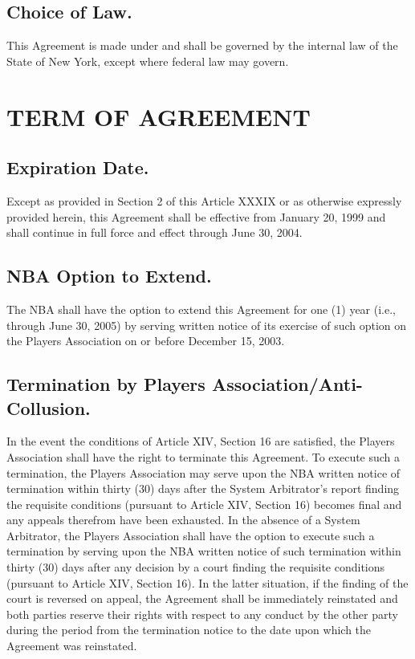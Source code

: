 \documentclass[
]{book}
\begin{document}
\hypertarget{choice-of-law.}{%
\section{Choice of Law.}\label{choice-of-law.}}

This Agreement is made under and shall be governed by the internal law of the State of New York, except where federal law may govern.

\hypertarget{term-of-agreement}{%
\chapter{TERM OF AGREEMENT}\label{term-of-agreement}}

\hypertarget{expiration-date.}{%
\section{Expiration Date.}\label{expiration-date.}}

Except as provided in Section 2 of this Article XXXIX or as otherwise expressly provided herein, this Agreement shall be effective from January 20, 1999 and shall continue in full force and effect through June 30, 2004.

\hypertarget{nba-option-to-extend.}{%
\section{NBA Option to Extend.}\label{nba-option-to-extend.}}

The NBA shall have the option to extend this Agreement for one (1) year (i.e., through June 30, 2005) by serving written notice of its exercise of such option on the Players Association on or before December 15, 2003.

\hypertarget{termination-by-players-associationanti-collusion.}{%
\section{Termination by Players Association/Anti-Collusion.}\label{termination-by-players-associationanti-collusion.}}

In the event the conditions of Article XIV, Section 16 are satisfied, the Players Association shall have the right to terminate this Agreement. To execute such a termination, the Players Association may serve upon the NBA written notice of termination within thirty (30) days after the System Arbitrator's report finding the requisite conditions (pursuant to Article XIV, Section 16) becomes final and any appeals therefrom have been exhausted. In the absence of a System Arbitrator, the Players Association shall have the option to execute such a termination by serving upon the NBA written notice of such termination within thirty (30) days after any decision by a court finding the requisite conditions (pursuant to Article XIV, Section 16). In the latter situation, if the finding of the court is reversed on appeal, the Agreement shall be immediately reinstated and both parties reserve their rights with respect to any conduct by the other party during the period from the termination notice to the date upon which the Agreement was reinstated.
\end{document}
